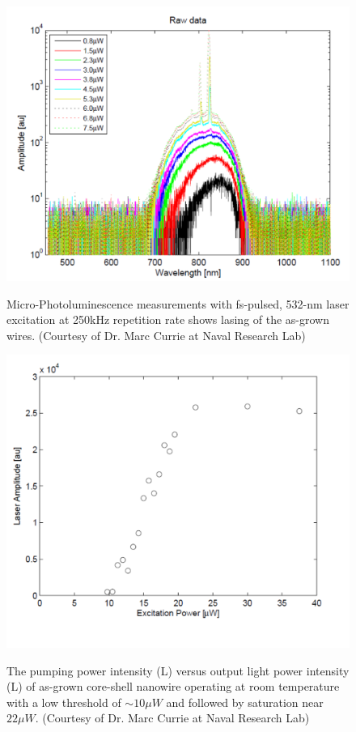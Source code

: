 \begin{figure}
  \caption{Micro-Photoluminescence measurements with fs-pulsed, 532-nm laser excitation at 250kHz repetition rate shows lasing of the as-grown wires. (Courtesy of Dr. Marc Currie at Naval Research Lab)}
  \centering
  \includegraphics[width=\textwidth]{pictures/Data/lasing}
  \label{lasing}
\end{figure}

\begin{figure}
\caption{The pumping power intensity (L) versus output light power intensity (L) of as-grown core-shell nanowire operating at room temperature with a low threshold of $\sim10{\mu}W$ and followed by saturation near $22{\mu}W$. (Courtesy of Dr. Marc Currie at Naval Research Lab)}
  \centering
  \includegraphics[width=\textwidth]{pictures/Data/expthreshold}
  \label{expthreshold}
\end{figure}
